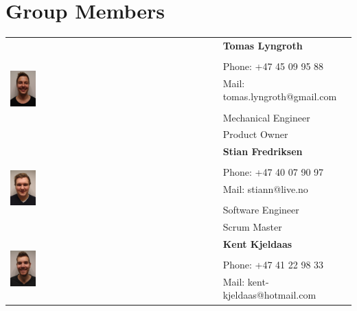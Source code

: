\section{Group Members}
    \begin{center}
    \begin{tabular}{|l|l|}\hline 
\multirow{7}{*}{\includegraphics[width = 0.125\textwidth]{VAPIQ-PICTURES/tomas}} &  \textbf{Tomas Lyngroth}  \\
 &   \\
 & Phone: +47 45 09 95 88  \\
 & Mail: tomas.lyngroth@gmail.com  \\
 &   \\
 &  Mechanical Engineer \\
 &  Product Owner\\ \hline
 \multirow{7}{*}{\includegraphics[width = 0.125\textwidth]{VAPIQ-PICTURES/stian}} & \textbf{Stian Fredriksen}  \\
 &   \\
 & Phone: +47 40 07 90 97  \\
 & Mail: stiann@live.no  \\
 &   \\
 & Software Engineer  \\
 & Scrum Master  \\ \hline
 \multirow{7}{*}{\includegraphics[width = 0.125\textwidth]{VAPIQ-PICTURES/kent}} & \textbf{Kent Kjeldaas}  \\
 &  \\
 & Phone: +47 41 22 98 33  \\
 & Mail: kent-kjeldaas@hotmail.com  \\

\end{tabular}
\end{center}
